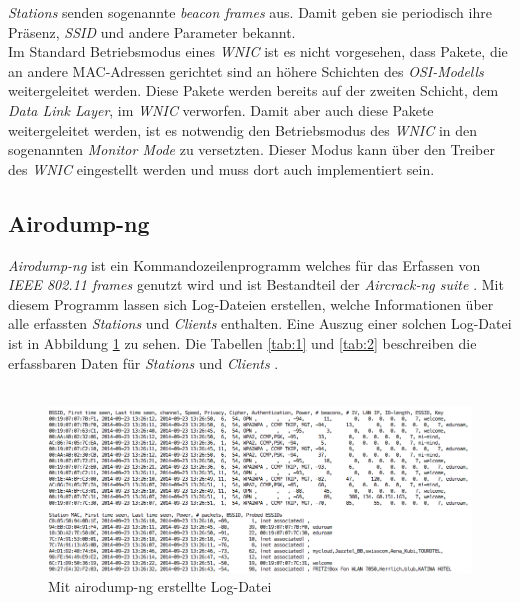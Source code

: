 \documentclass[]{report}
\begin{document}
\textit{Stations} senden sogenannte \textit{beacon frames} aus. Damit geben sie periodisch ihre Präsenz, \textit{SSID} und andere Parameter bekannt. \\
Im Standard Betriebsmodus eines \textit{WNIC} ist es nicht vorgesehen, dass Pakete, die an andere MAC-Adressen gerichtet sind an höhere Schichten des \textit{OSI-Modells} weitergeleitet werden. Diese Pakete werden bereits auf der zweiten Schicht, dem \textit{Data Link Layer}, im \textit{WNIC} verworfen. Damit aber auch diese Pakete weitergeleitet werden, ist es notwendig den Betriebsmodus des \textit{WNIC} in den sogenannten \textit{Monitor Mode} zu versetzten. Dieser Modus kann über den Treiber des \textit{WNIC} eingestellt werden und muss dort auch implementiert sein. 
\subsection{Airodump-ng}\label{lab:airodump-ng}
\textit{Airodump-ng} \cite{Airodump-ng} ist ein Kommandozeilenprogramm welches für das Erfassen von \textit{IEEE 802.11 frames} genutzt wird und ist Bestandteil der \textit{Aircrack-ng suite} \cite{Aircrack-ng}. Mit diesem Programm lassen sich Log-Dateien erstellen, welche Informationen über alle erfassten \textit{Stations} und \textit{Clients} enthalten. Eine Auszug einer solchen Log-Datei ist in Abbildung \ref{fig:log_file} zu sehen. Die Tabellen \ref{tab:1} und \ref{tab:2} beschreiben die erfassbaren Daten für \textit{Stations} und \textit{Clients} \cite{Airodump-ng}.\\ \\
\begin{figure}
    \centering
    \includegraphics[width=5.0in]{bilder/log.png}
    \caption{Mit airodump-ng erstellte Log-Datei}
    \label{fig:log_file}
\end{figure}
\end{document}
